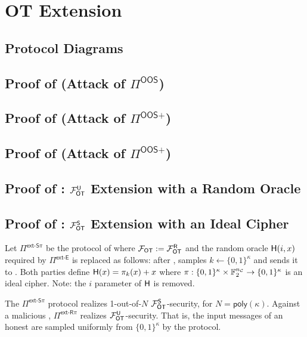 
\section{OT Extension }\label{sec:extApp}


\iffullversion
\else

\subsection{Protocol Diagrams}




\subsection{Proof of  (Attack of $\Pi^\textsf{OOS}$)}



\subsection{Proof of  (Attack of $\Pi^\textsf{OOS+}$)}



\subsection{Proof of  (Attack of $\Pi^\textsf{OOS+}$)}


\subsection{Proof of : $\mathcal{F}_{\mathsf{OT}}^\mathsf{U}$ Extension with a Random Oracle}



\subsection{Proof of : $\mathcal{F}_{\mathsf{OT}}^\mathsf{S}$ Extension with an Ideal Cipher}



\begin{definition}\label{def:ext_R_S}
	Let $\Pi^{\textsf{ext-S}\pi}$ be the protocol of  where $\mathcal{F}_{\mathsf{OT}}:=\mathcal{F}_{\mathsf{OT}}^\mathsf{R}$ and the random oracle $\mathsf{H}(i,x)$ required by $\Pi^{\textsf{ext-E}}$ is replaced as follows: after , \send samples $k\gets\{0,1\}^{\kappa}$ and sends it to \rec. Both parties define $\mathsf{H}(x)=\pi_k(x)+x$ where $\pi:\{0,1\}^{\kappa} \times \mathbb{F}^{{n_\mathcal{C}}}_2 \rightarrow\{0,1\}^\kappa$ is an ideal cipher. Note: the $i$ parameter of $\mathsf{H}$ is removed.
\end{definition}
\begin{lemma}\label{lem:ext_R_S}
	The $\Pi^{\textsf{ext-S}\pi}$ protocol realizes 1-out-of-$N$ $\mathcal{F}_{\mathsf{OT}}^\mathsf{S}$-security, for $N=\textsf{poly}(\kappa)$. Against a malicious \rec,  $\Pi^{\textsf{ext-R}\pi}$ realizes $\mathcal{F}_{\mathsf{OT}}^\mathsf{U}$-security. That is, the input messages of an honest \send are sampled uniformly from $\{0,1\}^\kappa$ by the protocol.
\end{lemma}

